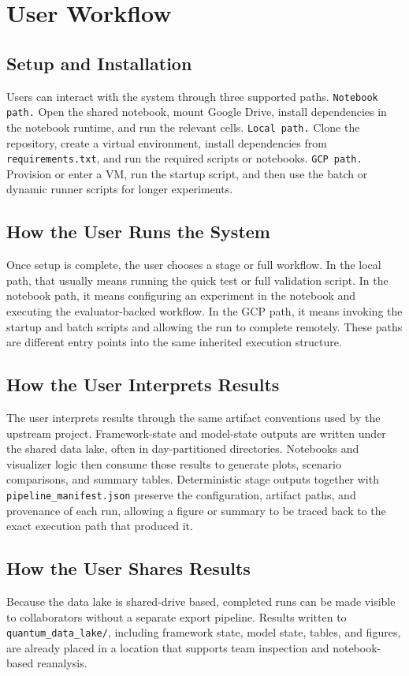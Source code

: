 \documentclass{IEEEtran}
\begin{document}
\section{User Workflow}

\subsection{Setup and Installation}
Users can interact with the system through three supported paths.
\texttt{Notebook path.} Open the shared notebook, mount Google Drive, install dependencies in the notebook runtime, and run the relevant cells.
\texttt{Local path.} Clone the repository, create a virtual environment, install dependencies from \texttt{requirements.txt}, and run the required
scripts or notebooks.
\texttt{GCP path.} Provision or enter a VM, run the startup script, and then use the batch or dynamic runner scripts for longer experiments.

\subsection{How the User Runs the System}
Once setup is complete, the user chooses a stage or full workflow. In the local path, that usually means running the quick test or full validation script. In the notebook path, it means configuring an experiment in the notebook and executing the evaluator-backed workflow. In the GCP path, it means invoking the startup and batch scripts and allowing the run to complete remotely. These paths are different entry points into the same inherited execution structure.

\subsection{How the User Interprets Results}
The user interprets results through the same artifact conventions used by the upstream project. Framework-state and model-state outputs are written under the shared data lake, often in day-partitioned directories. Notebooks and visualizer logic then consume those results to generate plots, scenario comparisons, and summary tables. Deterministic stage outputs together with \texttt{pipeline\_manifest.json} preserve the configuration, artifact paths, and provenance of each run, allowing a figure or summary to be traced back to the exact execution path that produced it.

\subsection{How the User Shares Results}
Because the data lake is shared-drive based, completed runs can be made visible to collaborators without a separate export pipeline. Results written to \texttt{quantum\_data\_lake/}, including framework state, model state, tables, and figures, are already placed in a location that supports team inspection and notebook-based reanalysis.
\end{document}
